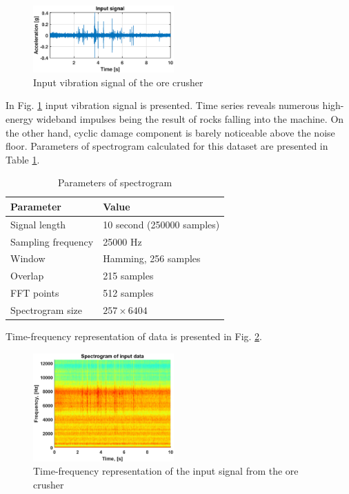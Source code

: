 \documentclass[journal]{IEEEtran}
\begin{document}
\begin{figure}[!ht]
\centering
\includegraphics[width = 0.48\textwidth]{figs3/input.eps}
\caption{Input vibration signal of the ore crusher}
\label{fig: input2}
\end{figure}

In Fig. \ref{fig: input2} input vibration signal is presented. Time series reveals numerous high-energy wideband impulses being the result of rocks falling into the machine. On the other hand, cyclic damage component is barely noticeable above the noise floor. Parameters of spectrogram calculated for this dataset are presented in Table \ref{tab:tab2}.


\begin{table}[ht!]
    \centering
    \caption{Parameters of spectrogram}
  \begin{tabular}{|l|l|}
    \hline
    \textbf{Parameter} & \textbf{Value} \\ \hline
         Signal length & 10 second (250000 samples) \\ \hline
         Sampling frequency & 25000 Hz \\ \hline
         Window & Hamming, 256 samples \\ \hline
         Overlap & 215 samples \\ \hline
         FFT points & 512 samples \\ \hline
         Spectrogram size & $257 \times 6404$ \\

    \hline
    \end{tabular}
    \label{tab:tab2}
\end{table}


Time-frequency representation of data is presented in Fig. \ref{fig: spec2}.

\begin{figure}[!ht]
\centering
\includegraphics[width = 0.48\textwidth]{figs3/spec.eps}
\caption{Time-frequency representation of the input signal from the ore crusher}
\label{fig: spec2}
\end{figure}
\end{document}
